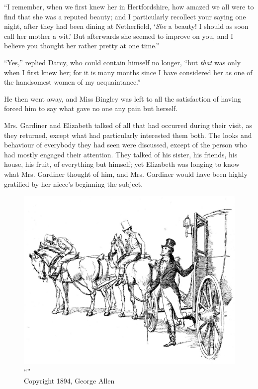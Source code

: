 ``I remember, when we first knew her in Hertfordshire, how amazed we all were to find that she was a reputed beauty; and I particularly recollect your saying one night, after they had been dining at Netherfield, `\textit{She} a beauty! I should as soon call her mother a wit.' But afterwards she seemed to improve on you, and I believe you thought her rather pretty at one time.''

``Yes,'' replied Darcy, who could contain himself no longer, ``but \textit{that} was only when I first knew her; for it is many months since I have considered her as one of the handsomest women of my acquaintance.''

He then went away, and Miss Bingley was left to all the satisfaction of having forced him to say what gave no one any pain but herself.

Mrs. Gardiner and Elizabeth talked of all that had occurred during their visit, as they returned, except what had particularly interested them both. The looks and behaviour of everybody they had seen were discussed, except of the person who had mostly engaged their attention. They talked of his sister, his friends, his house, his fruit, of everything but himself; yet Elizabeth was longing to know what Mrs. Gardiner thought of him, and Mrs. Gardiner would have been highly gratified by her niece's beginning the subject.

\begin{figure}[htbp]
    \centering
    \includegraphics[width=\textwidth]{illustrations/i_031.jpg}
    \caption{“”\\ Copyright 1894, George Allen}
    \label{fig:image}
\end{figure}


